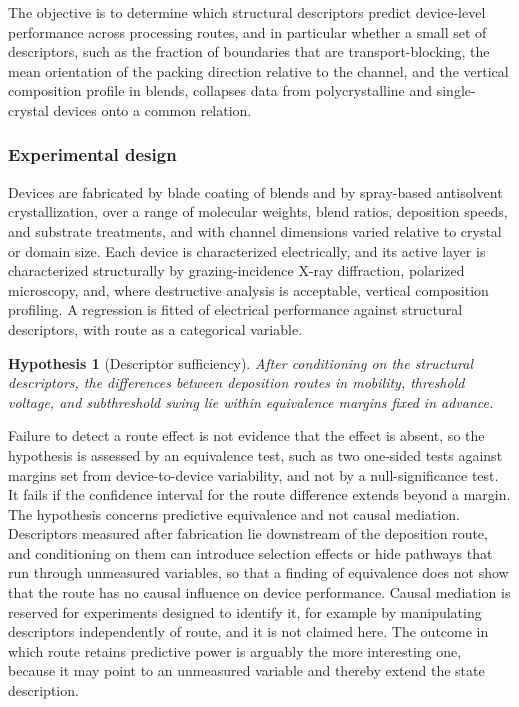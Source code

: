 \documentclass[11pt]{article}
\newtheorem{hypothesis}{Hypothesis}
\theoremstyle{definition}
\begin{document}
The objective is to determine which structural descriptors predict device-level performance across processing routes, and in particular whether a small set of descriptors, such as the fraction of boundaries that are transport-blocking, the mean orientation of the packing direction relative to the channel, and the vertical composition profile in blends, collapses data from polycrystalline and single-crystal devices onto a common relation.

\subsubsection*{Experimental design}

Devices are fabricated by blade coating of blends and by spray-based antisolvent crystallization, over a range of molecular weights, blend ratios, deposition speeds, and substrate treatments, and with channel dimensions varied relative to crystal or domain size. Each device is characterized electrically, and its active layer is characterized structurally by grazing-incidence X-ray diffraction, polarized microscopy, and, where destructive analysis is acceptable, vertical composition profiling. A regression is fitted of electrical performance against structural descriptors, with route as a categorical variable.

\begin{hypothesis}[Descriptor sufficiency]
\label{hyp:descriptor}
After conditioning on the structural descriptors, the differences between deposition routes in mobility, threshold voltage, and subthreshold swing lie within equivalence margins fixed in advance.
\end{hypothesis}

Failure to detect a route effect is not evidence that the effect is absent, so the hypothesis is assessed by an equivalence test, such as two one-sided tests against margins set from device-to-device variability, and not by a null-significance test. It fails if the confidence interval for the route difference extends beyond a margin. The hypothesis concerns predictive equivalence and not causal mediation. Descriptors measured after fabrication lie downstream of the deposition route, and conditioning on them can introduce selection effects or hide pathways that run through unmeasured variables, so that a finding of equivalence does not show that the route has no causal influence on device performance. Causal mediation is reserved for experiments designed to identify it, for example by manipulating descriptors independently of route, and it is not claimed here. The outcome in which route retains predictive power is arguably the more interesting one, because it may point to an unmeasured variable and thereby extend the state description.
\end{document}

